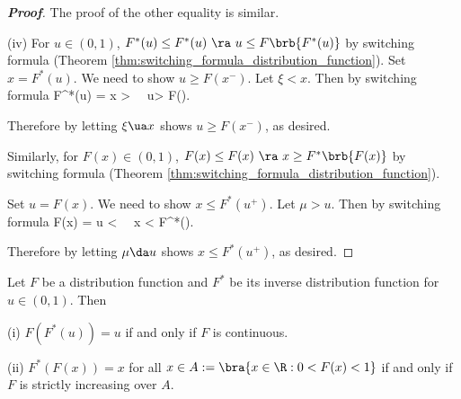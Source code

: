\begin{proof}[\bf Proof]
The proof of the other equality is similar.
%
%

\item [(iv)] For $u\in (0,1)$, $F^*(u) \leq F^*(u) \ \ra \ u\leq F\brb{F^*(u)}$ by switching formula (Theorem \ref{thm:switching_formula_distribution_function}). Set $x = F^*(u)$. We need to show $u\geq F(x^-)$. Let $\xi < x$. Then by switching formula
\be
F^*(u) = x > \xi \ \ra \ u> F(\xi).
\ee

Therefore by letting $\xi \ua x$ shows $u\geq F(x^-)$, as desired.

Similarly, for $F(x)\in (0,1)$, $F(x) \leq F(x) \ \ra \ x \geq F^*\brb{F(x)}$ by switching formula (Theorem \ref{thm:switching_formula_distribution_function}).

Set $u = F(x)$. We need to show $x \leq F^*(u^+)$. Let $\mu > u$. Then by switching formula
\be
F(x) = u < \mu \ \ra \ x < F^*(\mu).
\ee

Therefore by letting $\mu \da u$ shows $x \leq F^*(u^+)$, as desired.
\een
\end{proof}

\begin{corollary}\label{cor:continuous_distribution_function_inverse_composition}
Let $F$ be a distribution function and $F^*$ be its inverse distribution function for $u\in (0,1)$. Then
\ben
\item [(i)] $F(F^*(u)) = u$ if and only if $F$ is continuous.
\item [(ii)] $F^*(F(x)) = x$ for all $x\in A:=\bra{x\in \R:0<F(x)<1}$ if and only if $F$ is strictly increasing over $A$.
\een
\end{corollary}


